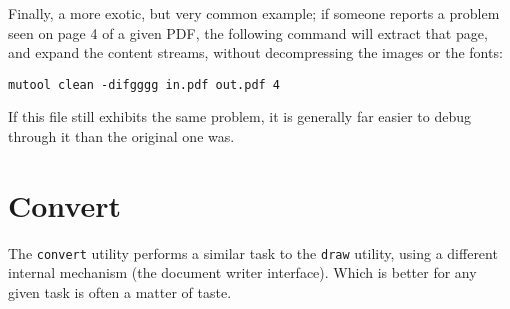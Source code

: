 \documentclass[oneside]{book}
\begin{document}
Finally, a more exotic, but very common example; if someone reports a problem seen on page 4 of a given PDF, the following command will extract that page, and expand the content streams, without decompressing the images or the fonts:

\begin{lstlisting}
mutool clean -difgggg in.pdf out.pdf 4
\end{lstlisting}

If this file still exhibits the same problem, it is generally far easier to debug through it than the original one was.

\section{Convert}

The \texttt{convert} utility performs a similar task to the \texttt{draw} utility, using a different internal mechanism (the document writer interface). Which is better for any given task is often a matter of taste.
\end{document}
